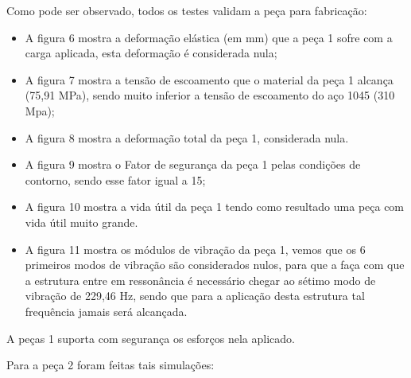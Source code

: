  

 
  
 
 
    Como pode ser observado, todos os testes validam a peça para fabricação:
    \begin{itemize}
        \item A figura 6 mostra a deformação elástica (em mm) que a peça 1 sofre com a carga aplicada, esta deformação é considerada nula;
        \item A figura 7 mostra a tensão de escoamento que o material da peça 1 alcança (75,91 MPa), sendo muito inferior a tensão de escoamento do aço 1045 (310 Mpa);
        \item A figura 8 mostra a deformação total da peça 1, considerada nula.
        \item A figura 9 mostra o Fator de segurança da peça 1 pelas condições de contorno, sendo esse fator igual a 15;
        \item A figura 10 mostra a vida útil da peça 1 tendo como resultado uma peça com vida útil muito grande.
        \item A figura 11 mostra os módulos de vibração da peça 1, vemos que os 6 primeiros modos de vibração são considerados nulos, para que a faça com que a estrutura entre em ressonância é necessário chegar ao sétimo modo de vibração de 229,46 Hz, sendo que para a aplicação desta estrutura tal frequência jamais será alcançada.
    \end{itemize}
    
    A peças 1 suporta com segurança os esforços nela aplicado.
 
    Para a peça 2 foram feitas tais simulações:
 
 
 
 
 
